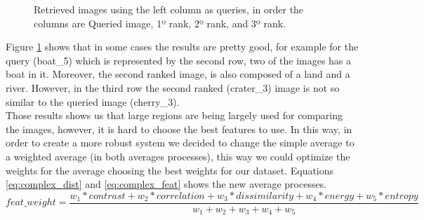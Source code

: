 \documentclass[12pt,a4paper]{article}
\begin{document}
\begin{figure}[!h]
{{		}
	}
	\enskip
	{
		{
			\setlength{\fboxsep}{1pt}
			\setlength{\fboxrule}{1pt}
		}
	}


	\caption{Retrieved images using the left column as queries, in order the columns are Queried image, 1º rank, 2º rank, and 3º rank.}
	\label{fig:simpleAvr}
\end{figure}

Figure \ref{fig:simpleAvr} shows that in some cases the results are pretty good, for example for the query (boat\_5) which is represented by the second row, two of the images has a boat in it. Moreover, the second ranked image, is also composed of a land and a river. However, in the third row the second ranked (crater\_3) image is not so similar to the queried image (cherry\_3). \\

Those results shows us that large regions are being largely used for comparing the images, however, it is hard to choose the best features to use. In this way, in order to create a more robust system we decided to change the simple average to a weighted average (in both averages processes), this way we could optimize the weights for the average choosing the best weights for our dataset. Equations \ref{eq:complex_dist} and \ref{eq:complex_feat} shows the new average processes. \\

\begin{equation}
feat\_weight =  \frac{w_1 * contrast + w_2 * correlation + w_3 * dissimilarity + w_4 *  energy + w_5 * entropy}{w_1 + w_2 + w_3 + w_4 + w_5}
\label{eq:complex_dist}
\end{equation}
\end{document}
